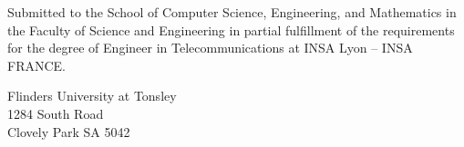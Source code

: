\begin{titlepage}
		\vspace{2cm}	
		
		\noindent\large Submitted to the School of Computer Science, Engineering, and Mathematics in the Faculty 
of Science and Engineering in partial fulfillment of the requirements for the degree of Engineer in Telecommunications at INSA Lyon –
 INSA FRANCE.
		
		\vspace{1.5cm}
		\noindent\large
		Flinders University at Tonsley\\
		1284 South Road\\
		Clovely Park SA 5042
\end{titlepage}